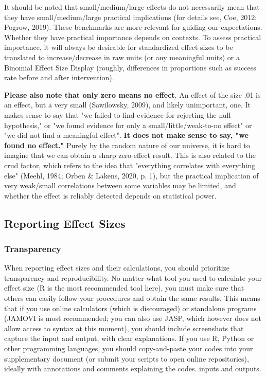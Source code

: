 \documentclass[
  man,
  colorlinks=true,linkcolor=blue,citecolor=blue,urlcolor=blue]{apa7}
\begin{document}
It should be noted that small/medium/large effects do not necessarily
mean that they have small/medium/large practical implications (for
details see, Coe, 2012; Pogrow, 2019). These benchmarks are more
relevant for guiding our expectations. Whether they have practical
importance depends on contexts. To assess practical importance, it will
always be desirable for standardized effect sizes to be translated to
increase/decrease in raw units (or any meaningful units) or a Binomial
Effect Size Display (roughly, differences in proportions such as success
rate before and after intervention).

\textbf{Please also note that only zero means no effect}. An effect of
the size .01 is an effect, but a very small (Sawilowsky, 2009), and
likely unimportant, one. It makes sense to say that "we failed to find
evidence for rejecting the null hypothesis," or "we found evidence for
only a small/little/weak-to-no effect" or "we did not find a meaningful
effect". \textbf{It does not make sense to say, "we found no effect."}
Purely by the random nature of our universe, it is hard to imagine that
we can obtain a sharp zero-effect result. This is also related to the
crud factor, which refers to the idea that "everything correlates with
everything else" (Meehl, 1984; Orben \& Lakens, 2020, p. 1), but the
practical implication of very weak/small correlations between some
variables may be limited, and whether the effect is reliably detected
depends on statistical power.

\hypertarget{reporting-effect-sizes}{%
\subsection{Reporting Effect Sizes}\label{reporting-effect-sizes}}

\hypertarget{transparency}{%
\subsubsection{Transparency}\label{transparency}}

When reporting effect sizes and their calculations, you should
prioritize transparency and reproducibility. No matter what tool you
used to calculate your effect size (R is the most recommended tool
here), you must make sure that others can easily follow your procedures
and obtain the same results. This means that if you use online
calculators (which is discouraged) or standalone programs (JAMOVI is
most recommended; you can also use JASP, which however does not allow
access to syntax at this moment), you should include screenshots that
capture the input and output, with clear explanations. If you use R,
Python or other programming languages, you should copy-and-paste your
codes into your supplementary document (or submit your scripts to open
online repositories), ideally with annotations and comments explaining
the codes. inputs and outputs.
\end{document}
